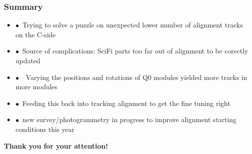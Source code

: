 \documentclass[aspectratio=1610, 12pt, xcolor=dvipsnames]{beamer}
\begin{document}

\begin{frame}\frametitle{Summary}
  \begin{itemize}
    \item $\bullet$\, Trying to solve a puzzle on unexpected lower number of alignment tracks on the C-side
    \item $\bullet$\, Source of complications: SciFi parts too far out of alignment to be corectly updated
    \item $\bullet$\, \to\, Varying the positions and rotations of Q0 modules yielded more tracks in more modules
    \item $\bullet$\, Feeding this back into tracking alignment to get the fine tuning right
    \item $\bullet$\, new survey/photogrammetry in progress to improve alignment starting conditions this year
  \end{itemize}
  \textbf{Thank you for your attention!}
\end{frame}

\end{document}
